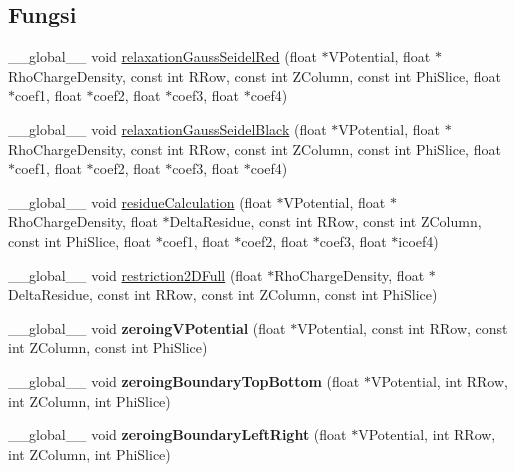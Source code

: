 \subsection*{Fungsi}
\begin{DoxyCompactItemize}
\item 
\+\_\+\+\_\+global\+\_\+\+\_\+ void \hyperlink{PoissonSolver3DGPU_8cu_a6717666a25f968bb1d43300401b2fefb}{relaxation\+Gauss\+Seidel\+Red} (float $\ast$V\+Potential, float $\ast$Rho\+Charge\+Density, const int R\+Row, const int Z\+Column, const int Phi\+Slice, float $\ast$coef1, float $\ast$coef2, float $\ast$coef3, float $\ast$coef4)
\item 
\+\_\+\+\_\+global\+\_\+\+\_\+ void \hyperlink{PoissonSolver3DGPU_8cu_a982f277a379105d427d851806c8ba49b}{relaxation\+Gauss\+Seidel\+Black} (float $\ast$V\+Potential, float $\ast$Rho\+Charge\+Density, const int R\+Row, const int Z\+Column, const int Phi\+Slice, float $\ast$coef1, float $\ast$coef2, float $\ast$coef3, float $\ast$coef4)
\item 
\+\_\+\+\_\+global\+\_\+\+\_\+ void \hyperlink{PoissonSolver3DGPU_8cu_a18166fae41f28362a43f5f09f3ddb537}{residue\+Calculation} (float $\ast$V\+Potential, float $\ast$Rho\+Charge\+Density, float $\ast$Delta\+Residue, const int R\+Row, const int Z\+Column, const int Phi\+Slice, float $\ast$coef1, float $\ast$coef2, float $\ast$coef3, float $\ast$icoef4)
\item 
\+\_\+\+\_\+global\+\_\+\+\_\+ void \hyperlink{PoissonSolver3DGPU_8cu_a249cfc3540088682931971eada57399c}{restriction2\+D\+Full} (float $\ast$Rho\+Charge\+Density, float $\ast$Delta\+Residue, const int R\+Row, const int Z\+Column, const int Phi\+Slice)
\item 
\hypertarget{PoissonSolver3DGPU_8cu_abc71b2402c0280e8d4cac1cf8673f335}{}\label{PoissonSolver3DGPU_8cu_abc71b2402c0280e8d4cac1cf8673f335} 
\+\_\+\+\_\+global\+\_\+\+\_\+ void {\bfseries zeroing\+V\+Potential} (float $\ast$V\+Potential, const int R\+Row, const int Z\+Column, const int Phi\+Slice)
\item 
\hypertarget{PoissonSolver3DGPU_8cu_a29b414b196e1406b97712de93ea3c648}{}\label{PoissonSolver3DGPU_8cu_a29b414b196e1406b97712de93ea3c648} 
\+\_\+\+\_\+global\+\_\+\+\_\+ void {\bfseries zeroing\+Boundary\+Top\+Bottom} (float $\ast$V\+Potential, int R\+Row, int Z\+Column, int Phi\+Slice)
\item 
\hypertarget{PoissonSolver3DGPU_8cu_a3a2c7f5369730745ba25aaee17c08a61}{}\label{PoissonSolver3DGPU_8cu_a3a2c7f5369730745ba25aaee17c08a61} 
\+\_\+\+\_\+global\+\_\+\+\_\+ void {\bfseries zeroing\+Boundary\+Left\+Right} (float $\ast$V\+Potential, int R\+Row, int Z\+Column, int Phi\+Slice)

\end{DoxyCompactItemize}
